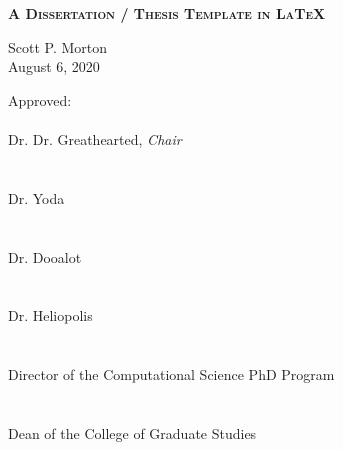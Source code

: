 \documentclass[12pt, oneside]{memoir}
\begin{document}
	
	\thispagestyle{empty}
	\begin{center}
	\vspace{2.54cm}\normalsize
	\begin{Large} \begin{SingleSpace}\bfseries \scshape A Dissertation / Thesis Template in \LaTeX \end{SingleSpace}\end{Large}
	\vspace{1.27cm}\normalsize
	Scott P. Morton\\
	August 6, 2020
	\vspace{0.85cm}\normalsize
	\end{center}
Approved:
\\
\newline
\indent\indent\makebox[4in]{\hrulefill}\\
\indent\indent Dr. Dr. Greathearted, \emph{Chair}\\
\\
\indent\indent\makebox[4in]{\hrulefill}\\
\indent\indent Dr. Yoda\\
\\
\indent\indent\makebox[4in]{\hrulefill}\\
\indent\indent Dr. Dooalot\\
\\
\indent\indent\makebox[4in]{\hrulefill}\\
\indent\indent Dr. Heliopolis\\
\\
\indent\indent\makebox[4in]{\hrulefill}\\
\indent\indent Director of the Computational Science PhD Program\\
\\
\indent\indent\makebox[4in]{\hrulefill}\\
\indent\indent Dean of the College of Graduate Studies



\end{document}
